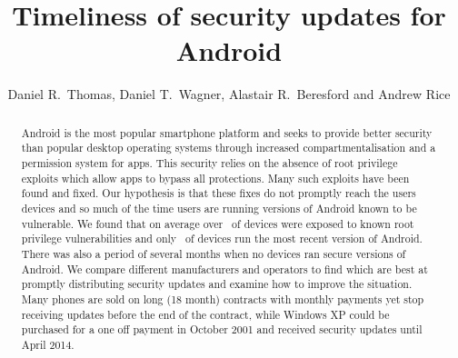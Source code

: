 \documentclass[conference,a4paper,twoside]{IEEEtran}
\author{Daniel R.\ Thomas, Daniel T.\ Wagner, Alastair R.\ Beresford and Andrew Rice}
\begin{document}
\title{Timeliness of security updates for Android}


\author{
}


\maketitle


\begin{abstract}
Android is the most popular smartphone platform and seeks to provide better security than popular desktop operating systems through increased compartmentalisation and a permission system for apps.
This security relies on the absence of root privilege exploits which allow apps to bypass all protections.
Many such exploits have been found and fixed.
Our hypothesis is that these fixes do not promptly reach the users devices and so much of the time users are running versions of Android known to be vulnerable.
We found that on average over \daMeanInsecurityPerc\ of devices were exposed to known root privilege vulnerabilities and only \daUpdatednessPerc\ of devices run the most recent version of Android.
There was also a period of several months when no devices ran secure versions of Android.
We compare different manufacturers and operators to find which are best at promptly distributing security updates and examine how to improve the situation.
Many phones are sold on long (18 month) contracts with monthly payments yet stop receiving updates before the end of the contract, while Windows XP could be purchased for a one off payment in October 2001 and received security updates until April 2014.
\end{abstract}
\end{document}
